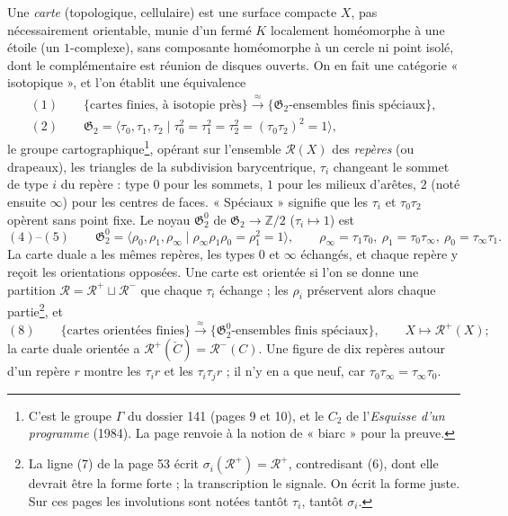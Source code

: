 \documentclass[11pt,a4paper]{article}
\begin{document}
Une \emph{carte} (topologique, cellulaire) est une surface compacte $X$, pas
nécessairement orientable, munie d'un fermé $K$ localement homéomorphe à une
étoile (un $1$-complexe), sans composante homéomorphe à un cercle ni point
isolé, dont le complémentaire est réunion de disques ouverts. On en fait une
catégorie « isotopique », et l'on établit une équivalence
\[
\begin{gathered}
(1)\qquad \{\text{cartes finies, à isotopie près}\} \xrightarrow{\ \approx\ } \{\mathfrak{G}_2\text{-ensembles finis spéciaux}\}, \\
(2)\qquad \mathfrak{G}_2 = \langle \tau_0, \tau_1, \tau_2 \mid \tau_0^2 = \tau_1^2 = \tau_2^2 = (\tau_0\tau_2)^2 = 1 \rangle,
\end{gathered}
\]
le groupe cartographique\footnote{C'est le groupe $\Gamma$ du dossier 141
(pages 9 et 10), et le $C_2$ de l'\emph{Esquisse d'un programme} (1984). La
page renvoie à la notion de « biarc » pour la preuve.}, opérant sur
l'ensemble $\mathcal{R}(X)$ des \emph{repères} (ou drapeaux), les triangles
de la subdivision barycentrique, $\tau_i$ changeant le sommet de type $i$ du
repère : type $0$ pour les sommets, $1$ pour les milieux d'arêtes, $2$ (noté
ensuite $\infty$) pour les centres de faces. « Spéciaux » signifie que les
$\tau_i$ et $\tau_0\tau_2$ opèrent sans point fixe. Le noyau
$\mathfrak{G}^0_2$ de $\mathfrak{G}_2 \to \mathbb{Z}/2$ ($\tau_i \mapsto 1$) est
\[
(4)\text{--}(5)\qquad \mathfrak{G}^0_2 = \langle \rho_0, \rho_1, \rho_\infty \mid \rho_\infty\rho_1\rho_0 = \rho_1^2 = 1 \rangle,
\qquad \rho_\infty = \tau_1\tau_0,\ \rho_1 = \tau_0\tau_\infty,\ \rho_0 = \tau_\infty\tau_1 .
\]
La carte duale a les mêmes repères, les types $0$ et $\infty$ échangés, et
chaque repère y reçoit les orientations opposées. Une carte est orientée si
l'on se donne une partition $\mathcal{R} = \mathcal{R}^+ \sqcup \mathcal{R}^-$
que chaque $\tau_i$ échange ; les $\rho_i$ préservent alors chaque
partie\footnote{La ligne (7) de la page 53 écrit
$\sigma_i(\mathcal{R}^+) = \mathcal{R}^+$, contredisant (6), dont elle devrait
être la forme forte ; la transcription le signale. On écrit la forme juste.
Sur ces pages les involutions sont notées tantôt $\tau_i$, tantôt
$\sigma_i$.}, et
\[
(8)\qquad \{\text{cartes orientées finies}\} \xrightarrow{\ \approx\ } \{\mathfrak{G}^0_2\text{-ensembles finis spéciaux}\}, \qquad X \mapsto \mathcal{R}^+(X) ;
\]
la carte duale orientée a $\mathcal{R}^+(\check C) = \mathcal{R}^-(C)$. Une
figure de dix repères autour d'un repère $r$ montre les $\tau_i r$ et les
$\tau_i\tau_j r$ ; il n'y en a que neuf, car $\tau_0\tau_\infty = \tau_\infty\tau_0$.
\end{document}
